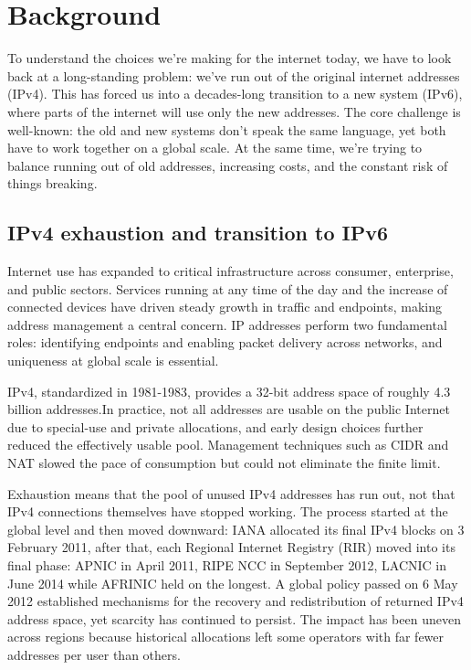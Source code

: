 \chapter{Background}
To understand the choices we're making for the internet today, we have to look back at a long-standing problem: we've run out of the original internet addresses (IPv4). This has forced us into a decades-long transition to a new system (IPv6), where parts of the internet will use only the new addresses. The core challenge is well-known: the old and new systems don't speak the same language, yet both have to work together on a global scale. At the same time, we’re trying to balance running out of old addresses, increasing costs, and the constant risk of things breaking\cite{7737362,LEVIN20141059}.

\section{IPv4 exhaustion and transition to IPv6}
Internet use has expanded to critical infrastructure across consumer, enterprise, and public sectors. Services running at any time of the day and the increase of connected devices have driven steady growth in traffic and endpoints, making address management a central concern\cite{7737362,LEVIN20141059}. IP addresses perform two fundamental roles: identifying endpoints and enabling packet delivery across networks, and uniqueness at global scale is essential\cite{LEVIN20141059}.

IPv4, standardized in 1981-1983, provides a 32-bit address space of roughly 4.3 billion addresses\cite{rfc791}.In practice, not all addresses are usable on the public Internet due to special-use and private allocations, and early design choices further reduced the effectively usable pool\cite{rfc1918,7737362,LEVIN20141059}. Management techniques such as CIDR and NAT slowed the pace of consumption but could not eliminate the finite limit\cite{7737362}.

Exhaustion means that the pool of unused IPv4 addresses has run out, not that IPv4 connections themselves have stopped working. The process started at the global level and then moved downward: IANA allocated its final IPv4 blocks on 3 February 2011, after that, each Regional Internet Registry (RIR) moved into its final phase: APNIC in April 2011, RIPE NCC in September 2012, LACNIC in June 2014 while AFRINIC held on the longest\cite{LEVIN20141059}. A global policy passed on 6 May 2012 established mechanisms for the recovery and redistribution of returned IPv4 address space, yet scarcity has continued to persist\cite{7737362}. The impact has been uneven across regions because historical allocations left some operators with far fewer addresses per user than others\cite{LEVIN20141059}.

